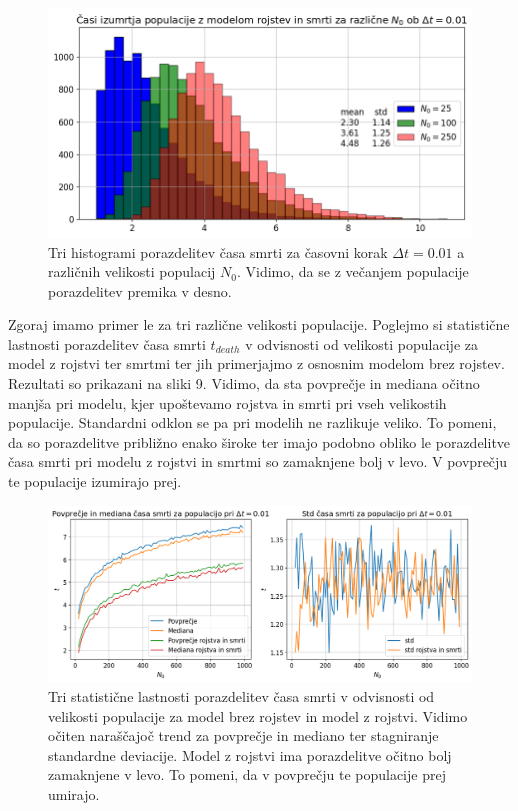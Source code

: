 \documentclass[slovene,11pt,a4paper]{article}
\begin{document}
\begin{figure}[h!]
\centering
\includegraphics[width=12cm]{slika8.png}
\caption{Tri histogrami porazdelitev časa smrti za časovni korak $\Delta t = 0.01$ a različnih velikosti populacij $N_0$. Vidimo, da se z večanjem populacije porazdelitev premika v desno.}
\end{figure}

Zgoraj imamo primer le za tri različne velikosti populacije. Poglejmo si statistične lastnosti porazdelitev časa smrti $t_{death}$ v odvisnosti od velikosti populacije za model z rojstvi ter smrtmi ter jih primerjajmo z osnosnim modelom brez rojstev. Rezultati so prikazani na sliki 9. Vidimo, da sta povprečje in mediana očitno manjša pri modelu, kjer upoštevamo rojstva in smrti pri vseh velikostih populacije. Standardni odklon se pa pri modelih ne razlikuje veliko. To pomeni, da so porazdelitve približno enako široke ter imajo podobno obliko le porazdelitve časa smrti pri modelu z rojstvi in smrtmi so zamaknjene bolj v levo. V povprečju te populacije izumirajo prej.

\newpage

\begin{figure}[h!]
\centering
\includegraphics[width=15cm]{slika9.png}
\caption{Tri statistične lastnosti porazdelitev časa smrti v odvisnosti od velikosti populacije za model brez rojstev in model z rojstvi. Vidimo očiten naraščajoč trend za povprečje in mediano ter stagniranje standardne deviacije. Model z rojstvi ima porazdelitve očitno bolj zamaknjene v levo. To pomeni, da v povprečju te populacije prej umirajo.}
\end{figure}
\end{document}
